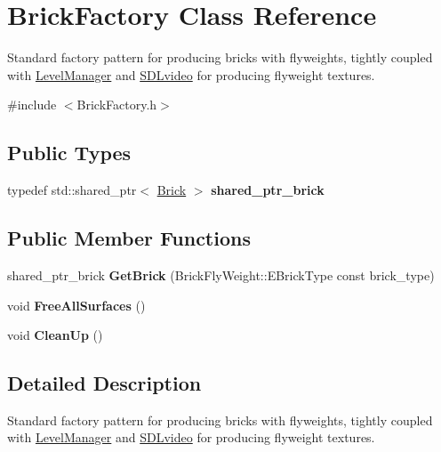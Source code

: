 \hypertarget{class_brick_factory}{}\section{Brick\+Factory Class Reference}
\label{class_brick_factory}


Standard factory pattern for producing bricks with flyweights, tightly coupled with \hyperlink{class_level_manager}{Level\+Manager} and \hyperlink{class_s_d_lvideo}{S\+D\+Lvideo} for producing flyweight textures.  




{\ttfamily \#include $<$Brick\+Factory.\+h$>$}

\subsection*{Public Types}
\begin{DoxyCompactItemize}
\item 
\hypertarget{class_brick_factory_a1b4958389153a74f1e6baf8ede9e000b}{}typedef std\+::shared\+\_\+ptr$<$ \hyperlink{class_brick}{Brick} $>$ {\bfseries shared\+\_\+ptr\+\_\+brick}\label{class_brick_factory_a1b4958389153a74f1e6baf8ede9e000b}

\end{DoxyCompactItemize}
\subsection*{Public Member Functions}
\begin{DoxyCompactItemize}
\item 
\hypertarget{class_brick_factory_a12dd1e3839193e381bc7198a876e472a}{}shared\+\_\+ptr\+\_\+brick {\bfseries Get\+Brick} (Brick\+Fly\+Weight\+::\+E\+Brick\+Type const brick\+\_\+type)\label{class_brick_factory_a12dd1e3839193e381bc7198a876e472a}

\item 
\hypertarget{class_brick_factory_a1dd70396dcdfc7ae2f5e1168b91d6bed}{}void {\bfseries Free\+All\+Surfaces} ()\label{class_brick_factory_a1dd70396dcdfc7ae2f5e1168b91d6bed}

\item 
\hypertarget{class_brick_factory_a200cfa3d335ed9291d6aa3e80227cb7d}{}void {\bfseries Clean\+Up} ()\label{class_brick_factory_a200cfa3d335ed9291d6aa3e80227cb7d}

\end{DoxyCompactItemize}


\subsection{Detailed Description}
Standard factory pattern for producing bricks with flyweights, tightly coupled with \hyperlink{class_level_manager}{Level\+Manager} and \hyperlink{class_s_d_lvideo}{S\+D\+Lvideo} for producing flyweight textures. 

